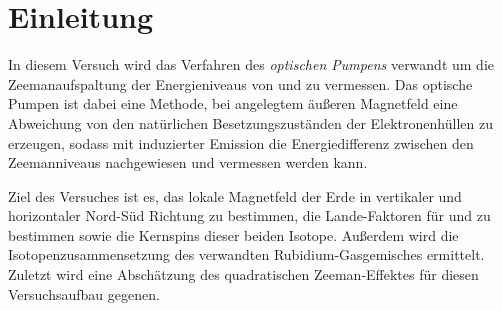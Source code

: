 

\section{Einleitung}
	In diesem Versuch wird das Verfahren des \textit{optischen Pumpens}
	verwandt um die Zeemanaufspaltung der Energieniveaus von  und
	 zu vermessen. Das optische Pumpen ist dabei eine Methode,
	bei angelegtem äußeren Magnetfeld
	eine Abweichung von den natürlichen Besetzungszuständen der
	Elektronenhüllen zu erzeugen, sodass mit induzierter Emission
	die Energiedifferenz zwischen den Zeemanniveaus nachgewiesen und
	vermessen werden kann.

	Ziel des Versuches ist es, das lokale
	Magnetfeld der Erde in vertikaler und horizontaler Nord-Süd
	Richtung zu bestimmen, die Lande-Faktoren für  und
	 zu bestimmen sowie die Kernspins dieser beiden Isotope.
	Außerdem wird die Isotopenzusammensetzung des
	verwandten Rubidium-Gasgemisches ermittelt. Zuletzt wird eine
	Abschätzung des quadratischen Zeeman-Effektes für diesen
	Versuchsaufbau gegenen.
